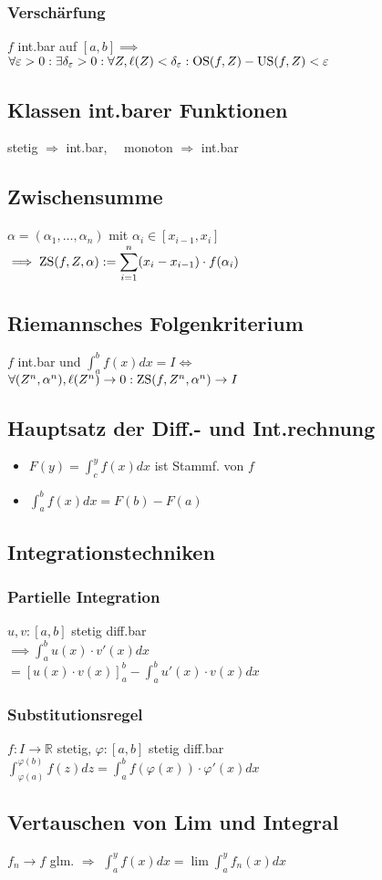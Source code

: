 \subsubsection*{Verschärfung}
$f$ int.bar auf $[a,b] \implies$ \\
$\forall \varepsilon>0:\exists \delta_\varepsilon>0: \forall Z, \ell(Z)<\delta_\varepsilon: \operatorname{OS}(f,Z)-\operatorname{US}(f,Z)<\varepsilon$

\subsection*{Klassen int.barer Funktionen}
stetig $\Rightarrow$ int.bar,~~
monoton $\Rightarrow$ int.bar

\subsection*{Zwischensumme}
$\alpha=(\alpha_1,\ldots,\alpha_n)$ mit $\alpha_i\in[x_{i-1},x_i]$ \\
$\displaystyle \implies \operatorname{ZS}(f,Z,\alpha) := \sum_{i=1}^n(x_i-x_{i-1})\cdot f(\alpha_i)$

\subsection*{Riemannsches Folgenkriterium}
$f$ int.bar und $\int_a^bf(x)dx=I \iff$ \\
$\forall(Z^n,\alpha^n), \ell(Z^n)\to0: \operatorname{ZS}(f,Z^n,\alpha^n)\to I$

\subsection*{Hauptsatz der Diff.- und Int.rechnung}
\begin{itemize}
	\item $F(y)=\int_c^yf(x)dx$ ist Stammf. von $f$
	\item $\int_a^bf(x)dx=F(b)-F(a)$
\end{itemize}

\subsection*{Integrationstechniken}

\subsubsection*{Partielle Integration}
$u,v:[a,b]$ stetig diff.bar \\
$\implies \int_a^bu(x)\cdot v'(x)dx$\\ $= [u(x)\cdot v(x)]_a^b - \int_a^bu'(x)\cdot v(x)dx$

\subsubsection*{Substitutionsregel}
$f:I\to\mathbb{R}$ stetig, $\varphi:[a,b]$ stetig diff.bar \\
$\int_{\varphi(a)}^{\varphi(b)}f(z)dz = \int_a^bf(\varphi(x))\cdot\varphi'(x)dx$

\subsection*{Vertauschen von Lim und Integral}
$f_n\to f$ glm. $\Rightarrow$
$\int_a^yf(x)dx=\lim\int_a^yf_n(x)dx$
